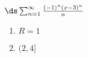 {$\ds\sum_{n=1}^\infty \frac{(-1)^n(x-3)^{n}}{n}$
}
{\begin{enumerate}
	\item $R=1$
	\item	$(2,4]$
\end{enumerate}
}